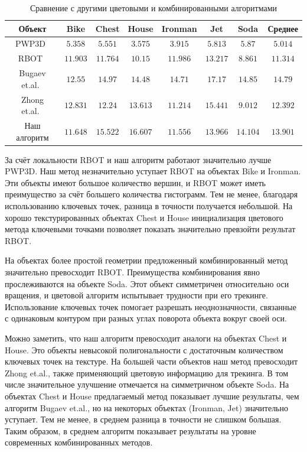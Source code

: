 \begin{table}[h]
\caption{\label{tab:analogues}Сравнение с другими цветовыми и комбинированными
алгоритмами}
\begin{center}
\begin{tabular}{|c|c|c|c|c|c|c|c|}
\hline
Объект & Bike & Chest & House & Ironman & Jet & Soda & Среднее \\
\hline
PWP3D~\cite{PWP3D} & $5.358$ & $5.551$ & $3.575$ &
$3.915$ & $5.813$ & $5.87$ & $5.014$ \\
\hline
RBOT~\cite{Tjaden2018} & $11.903$ & $11.764$ & $10.15$ &
$11.986$ & $13.217$ & $8.861$ & $11.314$ \\
\hline
Bugaev et.al.~\cite{Bugaev_2018_ECCV} & $12.55$ & $14.97$ & $14.48$ &
$\mathbf{14.71}$ & $\mathbf{17.17}$ & $\mathbf{14.85}$ & $\mathbf{14.79}$ \\
\hline
Zhong et.al.~\cite{Zhong2020} & $\mathbf{12.831}$ & $12.24$ & $13.613$ &
$11.214$ & $15.441$ & $9.012$ & $12.392$ \\
\hline
Наш алгоритм & $11.648$ & $\mathbf{15.522}$ & $\mathbf{16.607}$ & $11.556$ &
$13.966$ & $14.104$
& $13.901$ \\
\hline
\end{tabular}
\end{center}
\end{table}

За счёт локальности RBOT и наш алгоритм работают значительно лучше PWP3D. 
Наш метод незначительно уступает RBOT на объектах Bike и Ironman. Эти объекты
имеют большое количество вершин, и RBOT может иметь преимущество за счёт
большего количества гистограмм. Тем не менее, благодаря использованию ключевых
точек, разница в точности получается небольшой. На хорошо текстурированных
объектах Chest и House инициализация цветового метода ключевыми точками
позволяет показать значительно превзойти результат RBOT.

На объектах более простой геометрии предложенный комбинированный метод
значительно превосходит RBOT.
Преимущества комбинирования явно прослеживаются на объекте Soda. 
Этот объект симметричен относительно оси вращения, и цветовой алгоритм
испытывает трудности при его трекинге.
Использование ключевых точек помогает разрешать неоднозначности, связанные с
одинаковым контуром при разных углах поворота объекта вокруг своей оси.

Можно заметить, что наш алгоритм превосходит аналоги на объектах Chest и House.
Это объекты невысокой полигональности с достаточным количеством ключевых точек
на текстуре.
На большей части объектов наш метод превосходит Zhong et.al., также применяющий
цветовую информацию для трекинга.
В том числе значительное улучшение отмечается на симметричном объекте Soda.
На объектах Chest и House предлагаемый метод показывает лучшие результаты, чем
алгоритм Bugaev et.al., но на некоторых объектах (Ironman, Jet) значительно
уступает.
Тем не менее, в среднем разница в точности не слишком большая.
Таким образом, в среднем алгоритм показывает результаты на уровне современных
комбинированных методов.

